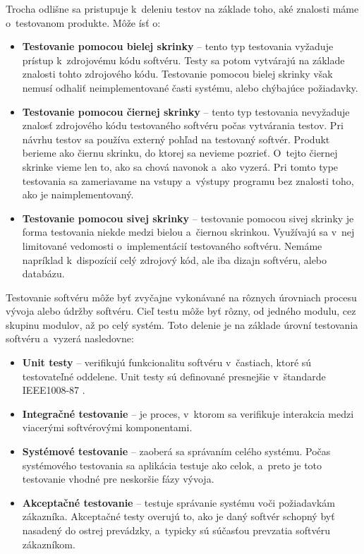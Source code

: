 \noindent Trocha odlišne sa pristupuje k~deleniu testov na základe toho, 
aké znalosti máme o~testovanom produkte. Môže ísť o:
\begin{itemize}
\item \textbf{Testovanie pomocou bielej skrinky} --
tento typ testovania vyžaduje prístup k~zdrojovému kódu softvéru. 
Testy sa potom vytvárajú na základe znalosti tohto zdrojového kódu.
Testovanie pomocou bielej skrinky však nemusí odhaliť neimplementované 
časti systému, alebo chýbajúce požiadavky.

\item \textbf{Testovanie pomocou čiernej skrinky} --
tento typ testovania nevyžaduje znalosť zdrojového kódu testovaného softvéru 
počas vytvárania testov. Pri návrhu testov sa používa externý pohľad na 
testovaný softvér.  Produkt berieme ako čiernu skrinku, do ktorej sa 
nevieme pozrieť. O~tejto čiernej skrinke vieme len to, ako sa chová 
navonok a~ako vyzerá. Pri tomto type testovania sa zameriavame na vstupy 
a~výstupy programu bez znalosti toho, ako je naimplementovaný.

\item \textbf{Testovanie pomocou sivej skrinky} --
testovanie pomocou sivej skrinky je forma testovania niekde medzi bielou
a~čiernou skrinkou. Využívajú sa v~nej limitované vedomosti 
o~implementácií testovaného softvéru. Nemáme napríklad k~dispozícií celý
zdrojový kód, ale iba dizajn softvéru, alebo databázu.
\end{itemize}

\noindent Testovanie softvéru môže byť zvyčajne vykonávané na rôznych úrovniach 
procesu vývoja alebo údržby softvéru. Cieľ testu môže byť rôzny, od jedného
modulu, cez skupinu modulov, až po celý systém.
Toto delenie je na základe úrovní testovania softvéru a~vyzerá nasledovne:
\begin{itemize}
\item \textbf{Unit testy} --
verifikujú funkcionalitu softvéru v~častiach, ktoré sú 
testovateľné oddelene.
Unit testy sú definované presnejšie v~štandarde IEEE1008-87 \cite{Ieee_unit}.

\item \textbf{Integračné testovanie} --
je proces, v~ktorom sa verifikuje interakcia medzi viacerými 
softvérovými komponentami.

\item \textbf{Systémové testovanie} --
zaoberá sa správaním celého systému. Počas systémového testovania sa 
aplikácia testuje ako celok, a~preto je toto testovanie vhodné pre 
neskoršie fázy vývoja.

\item \textbf{Akceptačné testovanie} --
testuje správanie systému voči požiadavkám zákazníka. Akceptačné testy 
overujú to, ako je daný softvér schopný byť nasadený do ostrej prevádzky, 
a~typicky sú súčasťou prevzatia softvéru zákazníkom.
\end{itemize}

